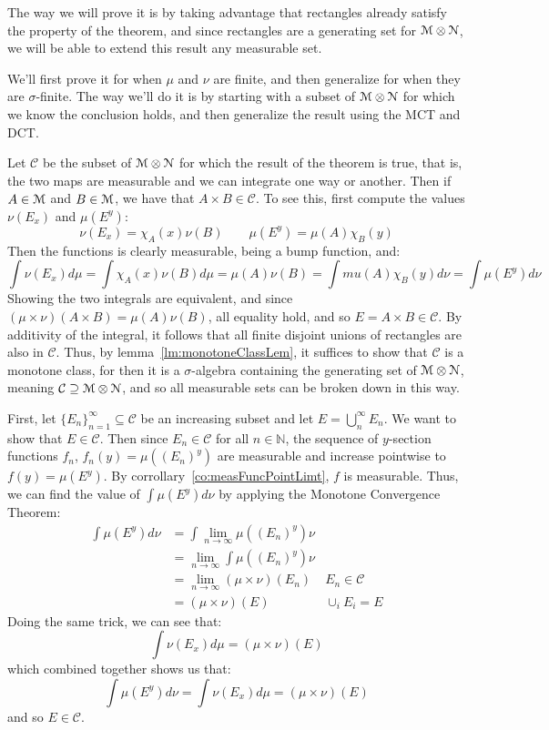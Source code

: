 \documentclass[oneside]{book}
\newcommand{\N}{\mathbb{N}}
\newcommand{\EM}{\EuScript{M}}
\newcommand{\EN}{\EuScript{N}}
\newcommand{\CC}{\mathcal{C}}
\newcommand{\sse}{\subseteq}
\newcommand{\rw}{\rightarrow}
\begin{document}
\begin{Proof}
	The way we will prove it is by taking advantage that rectangles already satisfy the property of the theorem, and since
	rectangles are a generating set for $\EM\otimes \EN$, we will be able to extend this result any measurable set. 

	We'll first prove it for when $\mu$ and $\nu$ are finite, and then generalize for when they are $\sigma$-finite. The
	way we'll do it is by starting with a subset of $\EM\otimes \EN$ for which we know the conclusion holds, and then
	generalize the result using the MCT and DCT. 


	Let $\CC$ be the subset of $\EM\otimes\EN$ for which the result of the theorem is true, that is, the two maps are
	measurable and we can integrate one way or another. Then if $A \in \EM$ and $B \in \EM$, we have that $A\times B \in
	\CC$. To see this, first compute the values $\nu(E_x)$ and $\mu(E^y)$:
	\[
		\nu(E_x) = \chi_A(x)\nu(B) \qquad \mu(E^y) = \mu(A)\chi_B(y)
	\]
	Then the functions is clearly measurable, being a bump function, and:
	\[
		\int \nu(E_x)d\mu = \int \chi_A(x)\nu(B)d\mu = \mu(A)\nu(B) = \int mu(A)\chi_B(y)d\nu = \int \mu(E^y)d\nu
	\]
	Showing the two integrals are equivalent, and since $(\mu\times \nu)(A\times B) = \mu(A)\nu(B)$, all equality hold,
	and so $E = A\times B \in \CC$. By additivity of the integral, it follows that all finite disjoint
	unions of rectangles are also in $\CC$. Thus, by lemma~\ref{lm:monotoneClassLem}, it suffices to show that $\CC$ is
	a monotone class, for then it is a $\sigma$-algebra containing the generating set of $\EM\otimes\EN$, meaning $\CC
	\supseteq \EM\otimes \EN$, and so all measurable sets can be broken down in this way. 

	First, let $\{E_n\}_{n=1}^\infty \sse \CC$ be an increasing subset and let $E =\bigcup_n^\infty E_n$. We want to
	show that $E \in \CC$. Then since $E_n \in \CC$ for all $n \in \N$, the sequence of $y$-section functions $f_n$,
	$f_n(y) = \mu((E_n)^y)$ are measurable and increase pointwise to $f(y) = \mu(E^y)$. By
	corrollary~\ref{co:measFuncPointLimt}, $f$ is measurable. Thus, we can find the value of $\int \mu(E^y)d\nu$ by
	applying the Monotone Convergence Theorem:
	\begin{align*}
		\int \mu(E^y)d\nu &= \int \lim_{n \rw \infty} \mu((E_n)^y)\nu\\
						  &= \lim_{n \rw \infty} \int \mu((E_n)^y)\nu\\
						  &= \lim_{n \rw \infty} (\mu\times \nu)(E_n) &E_n \in \CC\\
						  &= (\mu\times\nu)(E) & \cup_i E_i = E
	\end{align*}
	Doing the same trick, we can see that:
	\[
		\int \nu(E_x)d\mu = (\mu\times\nu)(E)
	\]
	which combined together shows us that:
	\[
		\int \mu(E^y)d\nu = \int \nu(E_x)d\mu = (\mu\times\nu)(E)
	\]
	and so $E \in \CC$. 


\end{Proof}
\end{document}
